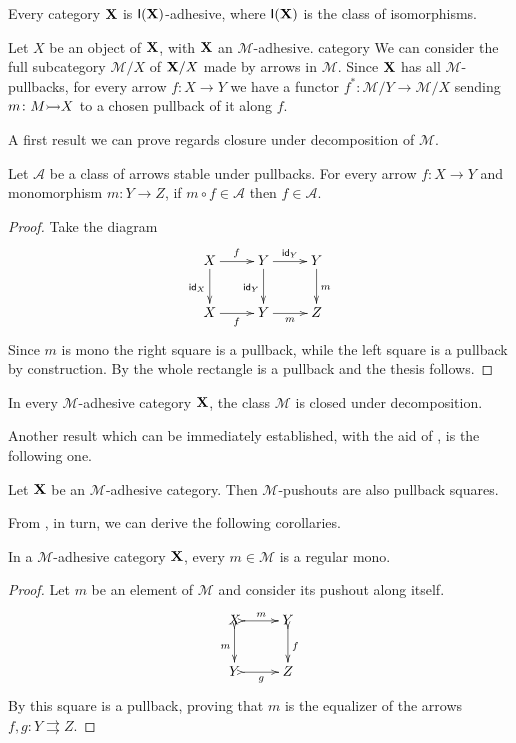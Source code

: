 \begin{remark}
	\label{rem:iso}
	Every category $\textbf {\textup{X}}$ is $\mathsf{I(\textbf {\textup{X}})}$-adhesive, where $\mathsf{I(\textbf {\textup{X}})}$ is the class of 
	isomorphisms.
\end{remark}


\begin{remark}\label{rem:pb}
	Let $X$ be an object of $\textbf {\textup{X}}$, with $\textbf {\textup{X}}$ an $\mathcal{M}$-adhesive. category We can consider  the full subcategory $\mathcal{M}/X$ of $\textbf {\textup{X}}/X$ made by arrows in $\mathcal{M}$. Since $\textbf {\textup{X}}$ has all $\mathcal{M}$-pullbacks, for every arrow $f\colon X\to Y$ we have a functor $f^*\colon \mathcal{M}/Y\to \mathcal{M}/X $ sending $m\colon M \mto X$ to a chosen pullback of it along $f$.
	\end{remark}

A first result we can prove regards closure under decomposition of $\mathcal{M}$.

\begin{proposition}\label{prop:deco}Let  $\mathcal{A}$ be a class of arrows stable under pullbacks. For every arrow $f\colon X\to Y$ and monomorphism $m\colon Y\to Z$, if $m\circ f \in\mathcal{A}$ then $f\in \mathcal{A}$.
\end{proposition}
\begin{proof}Take the diagram
	\[\xymatrix{X \ar[d]_{\id{X}}\ar[r]^{f}& Y \ar[r]^{\id{Y}}  \ar[d]_{\id{Y}}& Y \ar[d]^{m}\\
		X \ar[r]_{f}& Y \ar[r]_{m} & Z}\]
	Since $m$ is mono the right square is a pullback, while the left square is a pullback by construction. By  the whole rectangle is a pullback and the thesis follows.
\end{proof}
\begin{corollary}\label{cor:deco}
	In every $\mathcal{M}$-adhesive category $\textbf {\textup{X}}$, the class $\mathcal{M}$ is closed under decomposition.
\end{corollary}

Another result which can be immediately established, with the aid of , is the following one.
\begin{proposition}\label{prop:pbpoad}
	Let $\textbf {\textup{X}}$ be an $\mathcal{M}$-adhesive category. Then $\mathcal{M}$-pushouts are also pullback squares.
\end{proposition}

From , in turn, we can derive the following corollaries.
\begin{corollary}\label{cor:rego}
	In a $\mathcal{M}$-adhesive category $\textbf {\textup{X}}$, every $m\in\mathcal{M}$ is a regular mono.
\end{corollary}
\begin{proof}
Let $m$ be an element of $\mathcal{M}$ and consider its pushout along itself.
\[\xymatrix{X\ar@{>->}[r]^m \ar@{>->}[d]_m& Y\ar@{>->}[d]^{f}\\Y \ar@{>->}[r]_g & Z}\]
By  this square is a pullback, proving that $m$ is the equalizer of the arrows $f,g\colon Y\rightrightarrows Z$. \qedhere 
\end{proof}

